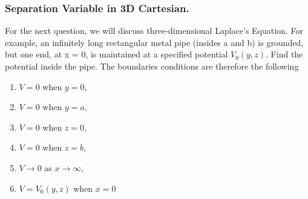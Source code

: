 \documentclass[../../../main.tex]{subfiles}
\begin{document}
\subsubsection*{Separation Variable in 3D Cartesian.} For the next question, we will discuss three-dimensional Laplace's Equation. For example, an infinitely long rectangular metal pipe (insides a and b) is grounded, but one end, at x = 0, is maintained at a specified potential $V_0(y, z)$. Find the potential inside the pipe. The boundaries conditions are therefore the following
\begin{enumerate}
    \item $V = 0$ when $y = 0$,
    \item $V = 0$ when $y = a$,
    \item $V = 0$ when $z = 0$,
    \item $V = 0$ when $z = b$,
    \item $V \rightarrow 0$ as $x \rightarrow \infty$,
    \item$ V = V_0(y, z)$ when $x = 0$
\end{enumerate}
\begin{figure*}[ht]
    \centering
\end{figure*}
\end{document}
